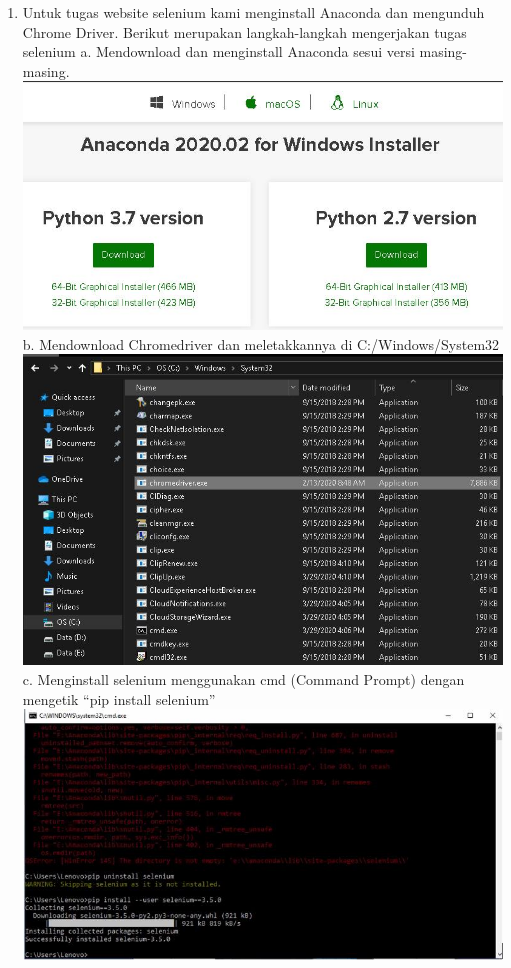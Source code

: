 \documentclass{article}
\begin{document}
        \begin{enumerate}
        \item Untuk tugas website selenium kami menginstall Anaconda dan mengunduh Chrome Driver.
        Berikut merupakan langkah-langkah mengerjakan tugas selenium
            \newline
        	a. Mendownload dan menginstall Anaconda sesui versi masing-masing.
            \newline
            \includegraphics[scale=0.5]{33.1a.jpg}
            \newline
        	b. Mendownload Chromedriver dan meletakkannya di C:/Windows/System32
            \newline
            \includegraphics[scale=0.5]{33.1b.jpg}
            \newline
        	c. Menginstall selenium menggunakan cmd (Command Prompt) dengan mengetik “pip install selenium”
            \newline
            \includegraphics[scale=0.5]{33.1c.jpg}

\end{enumerate}
\end{document}
